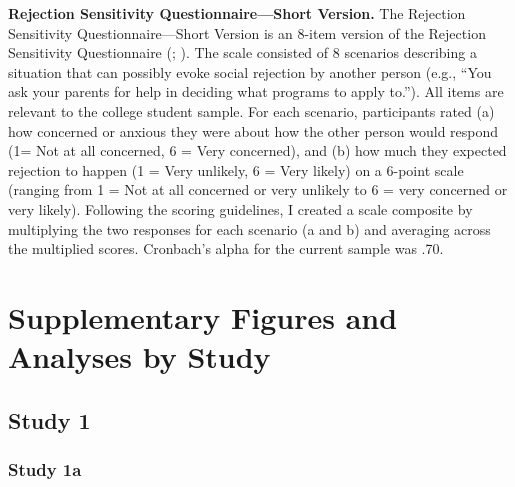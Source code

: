 \documentclass[
]{udthesis}
\begin{document}
\textbf{Rejection Sensitivity Questionnaire---Short Version.} The Rejection Sensitivity Questionnaire---Short Version is an 8-item version of the Rejection Sensitivity Questionnaire (; ). The scale consisted of 8 scenarios describing a situation that can possibly evoke social rejection by another person (e.g., ``You ask your parents for help in deciding what programs to apply to.''). All items are relevant to the college student sample. For each scenario, participants rated (a) how concerned or anxious they were about how the other person would respond (1= Not at all concerned, 6 = Very concerned), and (b) how much they expected rejection to happen (1 = Very unlikely, 6 = Very likely) on a 6-point scale (ranging from 1 = Not at all concerned or very unlikely to 6 = very concerned or very likely). Following the scoring guidelines, I created a scale composite by multiplying the two responses for each scenario (a and b) and averaging across the multiplied scores. Cronbach's alpha for the current sample was .70.

\chapter{Supplementary Figures and Analyses by Study}\label{supplementary-figures-and-analyses-by-study}

\section{Study 1}\label{study-1}

\subsection{Study 1a}\label{study-1a}
\end{document}
